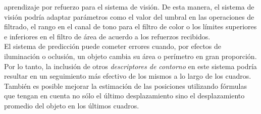aprendizaje por refuerzo para el sistema de visi\'on. De esta manera, el 
sistema de visi\'on podr\'ia adaptar par\'ametros como el valor del umbral en las
operaciones de filtrado, el rango en el canal de tono para el filtro de color o los l\'imites 
superiores e inferiores en el filtro de \'area de acuerdo a los 
refuerzos recibidos.\\
\indent El sistema de predicci\'on puede cometer errores cuando, por 
efectos de iluminaci\'on o oclusi\'on, un objeto cambia su \'area o 
per\'imetro en gran proporci\'on. Por lo tanto, la inclusi\'on de otros 
\emph{descriptores de contorno} en este sistema podr\'ia resultar en un 
seguimiento m\'as efectivo de los mismos a lo largo de los cuadros. 
Tambi\'en es posible mejorar la estimaci\'on de las posiciones utilizando 
f\'ormulas que tengan en cuenta no s\'olo el \'ultimo desplazamiento sino 
el desplazamiento promedio del objeto en los \'ultimos cuadros.



